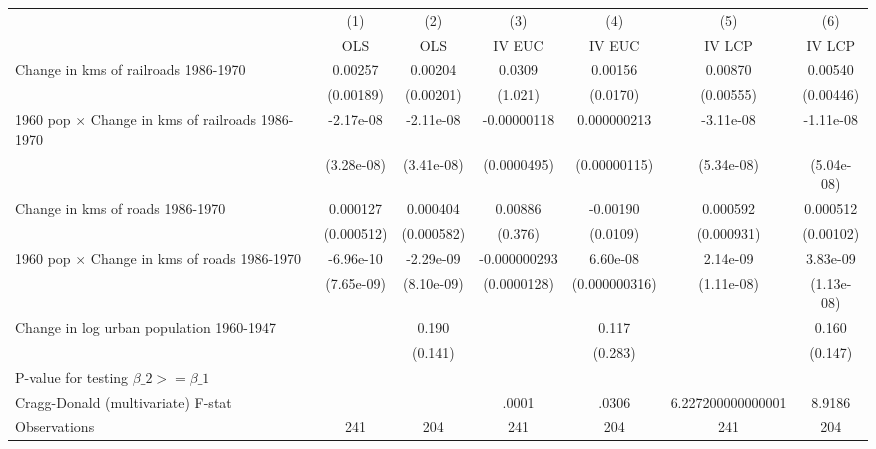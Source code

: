 {
\def\sym#1{\ifmmode^{#1}\else\(^{#1}\)\fi}
\begin{tabular}{l*{6}{c}}
\hline\hline
                &\multicolumn{1}{c}{(1)}&\multicolumn{1}{c}{(2)}&\multicolumn{1}{c}{(3)}&\multicolumn{1}{c}{(4)}&\multicolumn{1}{c}{(5)}&\multicolumn{1}{c}{(6)}\\
                &\multicolumn{1}{c}{OLS}&\multicolumn{1}{c}{OLS}&\multicolumn{1}{c}{IV EUC}&\multicolumn{1}{c}{IV EUC}&\multicolumn{1}{c}{IV LCP}&\multicolumn{1}{c}{IV LCP}\\
\hline
Change in kms of railroads 1986-1970&  0.00257         &  0.00204         &   0.0309         &  0.00156         &  0.00870         &  0.00540         \\
                &(0.00189)         &(0.00201)         &  (1.021)         & (0.0170)         &(0.00555)         &(0.00446)         \\
[1em]
1960 pop $\times$ Change in kms of railroads 1986-1970&-2.17e-08         &-2.11e-08         &-0.00000118         &0.000000213         &-3.11e-08         &-1.11e-08         \\
                &(3.28e-08)         &(3.41e-08)         &(0.0000495)         &(0.00000115)         &(5.34e-08)         &(5.04e-08)         \\
[1em]
Change in kms of roads 1986-1970& 0.000127         & 0.000404         &  0.00886         & -0.00190         & 0.000592         & 0.000512         \\
                &(0.000512)         &(0.000582)         &  (0.376)         & (0.0109)         &(0.000931)         &(0.00102)         \\
[1em]
1960 pop $\times$ Change in kms of roads 1986-1970&-6.96e-10         &-2.29e-09         &-0.000000293         & 6.60e-08         & 2.14e-09         & 3.83e-09         \\
                &(7.65e-09)         &(8.10e-09)         &(0.0000128)         &(0.000000316)         &(1.11e-08)         &(1.13e-08)         \\
[1em]
Change in log urban population 1960-1947&                  &    0.190         &                  &    0.117         &                  &    0.160         \\
                &                  &  (0.141)         &                  &  (0.283)         &                  &  (0.147)         \\
\hline
P-value for testing $\beta\_{2} >= \beta\_{1}$&                  &                  &                  &                  &                  &                  \\
Cragg-Donald (multivariate) F-stat&                  &                  &    .0001         &    .0306         &6.227200000000001         &   8.9186         \\
Observations    &      241         &      204         &      241         &      204         &      241         &      204         \\
\hline\hline
\end{tabular}
}
